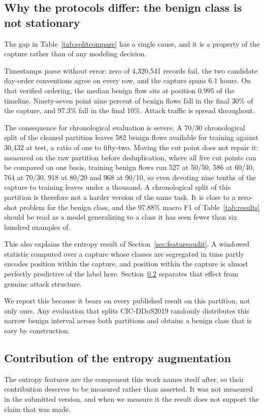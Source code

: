 \documentclass{ieeeaccess}
\begin{document}
\subsection{Why the protocols differ: the benign class is not stationary}
\label{sec:benignstructure}
\label{sec:temporal}
The gap in Table~\ref{tab:splitcompare} has a single cause, and it is a property
of the capture rather than of any modeling decision.

Timestamps parse without error: zero of 4,320,541 records fail, the two candidate
day-order conventions agree on every row, and the capture spans 6.1 hours. On that
verified ordering, the median benign flow sits at position $0.995$ of the
timeline. Ninety-seven point nine percent of benign flows fall in the final 30\%
of the capture, and 97.3\% fall in the final 10\%. Attack traffic is spread
throughout.

The consequence for chronological evaluation is severe. A 70/30 chronological
split of the cleaned partition leaves 582 benign flows available for training
against 30,432 at test, a ratio of one to fifty-two. Moving the cut point does
not repair it: measured on the raw partition before deduplication, where all five
cut points can be compared on one basis, training benign flows run 527 at 50/50,
586 at 60/40, 764 at 70/30, 918 at 80/20 and 968 at 90/10, so even devoting nine
tenths of the capture to training leaves under a thousand. A chronological split of this
partition is therefore not a harder version of the same task. It is close to a
zero-shot problem for the benign class, and the 97.88\% macro F1 of
Table~\ref{tab:results} should be read as a model generalizing to a class it has
seen fewer than six hundred examples of.

This also explains the entropy result of Section~\ref{sec:featureaudit}. A
windowed statistic computed over a capture whose classes are segregated in time
partly encodes position within the capture, and position within the capture is
almost perfectly predictive of the label here. Section~\ref{sec:entropycontrib}
separates that effect from genuine attack structure.

We report this because it bears on every published result on this partition, not
only ours. Any evaluation that splits CIC-DDoS2019 randomly distributes this
narrow benign interval across both partitions and obtains a benign class that is
easy by construction.

\subsection{Contribution of the entropy augmentation}
\label{sec:entropycontrib}
The entropy features are the component this work names itself after, so their
contribution deserves to be measured rather than asserted. It was not measured
in the submitted version, and when we measure it the result does not support the
claim that was made.
\end{document}
